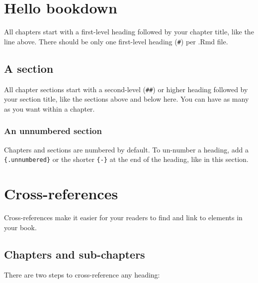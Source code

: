 \documentclass[
  french,
]{book}
\theoremstyle{definition}
\theoremstyle{definition}
\theoremstyle{definition}
\theoremstyle{definition}
\theoremstyle{remark}
\begin{document}
\chapter{Hello bookdown}

All chapters start with a first-level heading followed by your chapter title, like the line above. There should be only one first-level heading (\texttt{\#}) per .Rmd file.

\section{A section}

All chapter sections start with a second-level (\texttt{\#\#}) or higher heading followed by your section title, like the sections above and below here. You can have as many as you want within a chapter.

\subsection*{An unnumbered section}

Chapters and sections are numbered by default. To un-number a heading, add a \texttt{\{.unnumbered\}} or the shorter \texttt{\{-\}} at the end of the heading, like in this section.

\chapter{Cross-references}\label{cross}

Cross-references make it easier for your readers to find and link to elements in your book.

\section{Chapters and sub-chapters}

There are two steps to cross-reference any heading:
\end{document}
